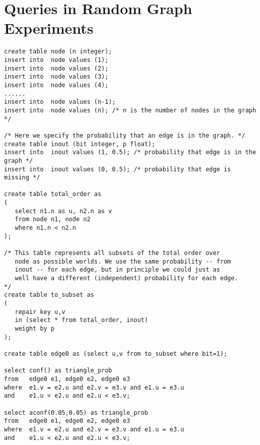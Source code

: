 \chapter{Queries in Random Graph Experiments} 
\label{app:randgraph}

\begin{verbatim}
create table node (n integer);
insert into  node values (1);
insert into  node values (2);
insert into  node values (3);
insert into  node values (4);
......
insert into  node values (n-1);
insert into  node values (n); /* n is the number of nodes in the graph */

/* Here we specify the probability that an edge is in the graph. */
create table inout (bit integer, p float);
insert into  inout values (1, 0.5); /* probability that edge is in the graph */
insert into  inout values (0, 0.5); /* probability that edge is missing */

create table total_order as
(
   select n1.n as u, n2.n as v
   from node n1, node n2
   where n1.n < n2.n
);

/* This table represents all subsets of the total order over
   node as possible worlds. We use the same probability -- from
   inout -- for each edge, but in principle we could just as
   well have a different (independent) probability for each edge.
*/
create table to_subset as
(
   repair key u,v
   in (select * from total_order, inout)
   weight by p
);

create table edge0 as (select u,v from to_subset where bit=1);

select conf() as triangle_prob
from   edge0 e1, edge0 e2, edge0 e3
where  e1.v = e2.u and e2.v = e3.v and e1.u = e3.u
and    e1.u < e2.u and e2.u < e3.v;

select aconf(0.05,0.05) as triangle_prob
from   edge0 e1, edge0 e2, edge0 e3
where  e1.v = e2.u and e2.v = e3.v and e1.u = e3.u
and    e1.u < e2.u and e2.u < e3.v;

\end{verbatim}
\newpage
